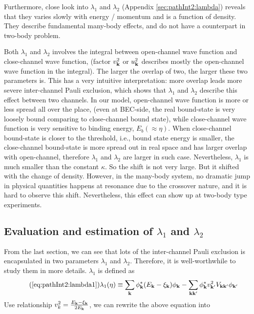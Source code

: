 Furthermore,  close look into $\lambda_1$ and $\lambda_2$ (Appendix \ref{sec:pathInt2:lambda}) reveals that they varies slowly with energy / momentum and is a function of density.  They describe  fundamental many-body effects, and do not have a counterpart in two-body problem.  

Both $\lambda_{1}$ and $\lambda_{2}$ involves the integral between open-channel wave function and close-channel wave function, (factor $v_{\mathbf{k}}^{2}$ or $u_{\mathbf{k}}^{2}$ describes mostly the open-channel wave function in the integral). The larger the overlap of two, the larger these two parameters is.  This has a very intuitive interpretation:  more overlap leads more severe inter-channel Pauli exclusion, which shows that $\lambda_{1}$ and $\lambda_{2}$ describe this effect between two  channels.  In our model, open-channel wave function is more or less spread all over the place, (even at BEC-side, the real bound-state is very loosely bound comparing to close-channel bound state), while close-channel wave function is very sensitive to binding energy, $E_{b}(\approx\eta)$.  When  close-channel  bound-state is closer to the threshold, i.e.,  bound state energy  is smaller, the close-channel bound-state is more spread out  in real space and has larger overlap with open-channel, therefore $\lambda_{1}$ and $\lambda_{2}$ are larger in such case.                           Nevertheless, $\lambda_1$ is much smaller than the  constant $\kappa$.  So the shift is not very large.  But it shifted with the change of density.  However, in the many-body system, no dramatic jump in physical quantities happens at resonance due to the crossover nature, and it is hard to observe this shift.  Nevertheless, this effect can show up at two-body type experiments.  


\subsection{Evaluation and estimation of $\lambda_{1}$ and $\lambda_{2}$\label{sec:pathInt2:lambda}}
From the last section, we can see  that lots of the inter-channel Pauli exclusion is encapsulated in two parameters $\lambda_{1}$ and $\lambda_{2}$.   Therefore, it is well-worthwhile to study them in more details.  $\lambda_{1}$ is defined as 
\begin{equation}\tag{\ref{eq:pathInt2:lambda1}}
\lambda_{1}(\eta)\equiv\sum_{\vk}{\phi_{\vk}^{*}}{(E_{\vk}-\xi_{\vk})}\phi_{\vk}
	-\sum_{\vk\vk'}{\phi_{\vk}^{*}}{v_{\vk'}^{2}V_{\vk\vk'}}\phi_{\vk'}
\end{equation}
Use relationship $v_{k}^{2}=\frac{E_{\mathbf{k}}-\xi_{\mathbf{k}}}{2E_{\mathbf{k}}}$, we can rewrite the above equation into 

